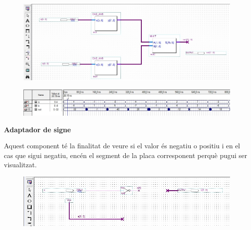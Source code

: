 \documentclass[12pt, a4papre]{article}
\begin{document}
	\begin{center}
	\begin{figure}[H]
		\begin{center}
		\includegraphics[width=150mm]{multCA2_4B.jpeg}
		\end{center}
	\end{figure}
	
	\end{center}
	\begin{center}
	\begin{figure}[H]
		\begin{center}
		\includegraphics[width=150mm]{multCA2_4Bsimul.jpeg}
		\end{center}
	\end{figure}
	
	\end{center}
	
	
	\textbf{\large{Adaptador de signe}}
	
	Aquest component té la finalitat de veure si el valor és negatiu o positiu i en el cas que sigui negatiu, encén el segment de la placa corresponent perquè pugui ser visualitzat.
	
	\begin{center}
	\begin{figure}[H]
		\begin{center}
		\includegraphics[width=150mm]{adaptSigne.jpeg}
		\end{center}
	\end{figure}
	
	\end{center}
	
\end{document}

